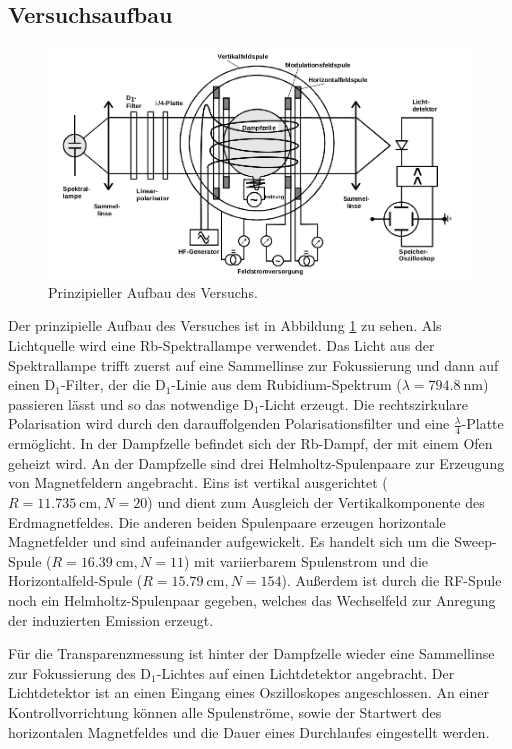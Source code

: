\subsection{Versuchsaufbau}
\label{sec:Versuchsaufbau}
\begin{figure}
  \centering
  \includegraphics[width=0.9\columnwidth]{pictures/aufbau.png}
  \caption{Prinzipieller Aufbau des Versuchs.\cite{Anleitung}}
  \label{fig:aufbau}
\end{figure}
%
Der prinzipielle Aufbau des Versuches ist in Abbildung \ref{fig:aufbau}
zu sehen.
Als Lichtquelle wird eine Rb-Spektrallampe verwendet.
Das Licht aus der Spektrallampe trifft zuerst auf eine Sammellinse
zur Fokussierung und dann auf einen
D$_1$-Filter, der die D$_1$-Linie aus dem Rubidium-Spektrum
($\lambda = \SI{794,8}{\nano\meter}$) passieren lässt und so das
notwendige D$_1$-Licht erzeugt. Die rechtszirkulare Polarisation
wird durch den darauffolgenden Polarisationsfilter und eine $\frac{\lambda}{4}$-Platte ermöglicht.
In der Dampfzelle befindet sich der Rb-Dampf, der mit einem Ofen geheizt
wird. An der Dampfzelle sind drei Helmholtz-Spulenpaare zur Erzeugung von
Magnetfeldern angebracht. Eins ist vertikal ausgerichtet
($R=\SI{11,735}{\centi\meter}, N=20$) und dient
zum Ausgleich der Vertikalkomponente des Erdmagnetfeldes.
Die anderen beiden Spulenpaare erzeugen horizontale Magnetfelder und sind
aufeinander aufgewickelt. Es handelt sich um die Sweep-Spule ($R=\SI{16,39}{\centi\meter}, N=11$) mit variierbarem Spulenstrom und die
Horizontalfeld-Spule ($R=\SI{15,79}{\centi\meter}, N=154$).
Außerdem ist durch die RF-Spule noch ein Helmholtz-Spulenpaar gegeben, welches das
Wechselfeld zur Anregung der induzierten Emission erzeugt.

Für die Transparenzmessung ist hinter der Dampfzelle wieder eine Sammellinse zur Fokussierung
des D$_1$-Lichtes auf einen Lichtdetektor angebracht. Der Lichtdetektor ist an einen Eingang
eines Oszilloskopes angeschlossen.
An einer Kontrollvorrichtung können alle Spulenströme, sowie der Startwert des horizontalen
Magnetfeldes und die Dauer eines Durchlaufes eingestellt werden.
